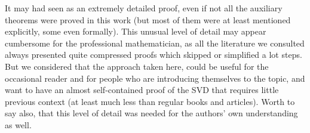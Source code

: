 It may had seen as an extremely detailed proof, even if not all the
auxiliary theorems were proved in this work (but most of them were at least
mentioned explicitly, some even formally). This unusual level of
detail may appear cumbersome for the professional mathematician, as all the
literature we consulted always presented quite compressed proofs which
skipped or simplified a lot steps. But we
considered that the approach taken here, could be useful for the occasional
reader and for people who are introducing themselves to the topic, and
want to have an almost self-contained proof of the SVD that requires
little previous context (at least much less than regular books and
articles).  Worth to say also, that this level of detail was needed
for the authors' own understanding as well.  


